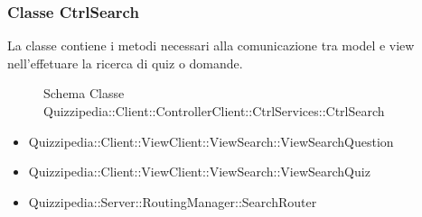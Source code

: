 \subsubsection{Classe CtrlSearch}
La classe contiene i metodi necessari alla comunicazione tra model e view nell'effetuare la ricerca di quiz o domande.
\begin{figure}[H]
\centering
\noindent{}
\caption{Schema Classe Quizzipedia::Client::ControllerClient::CtrlServices::CtrlSearch}
\end{figure}
\begin{itemize}
\item Quizzipedia::Client::ViewClient::ViewSearch::ViewSearchQuestion
\item Quizzipedia::Client::ViewClient::ViewSearch::ViewSearchQuiz
\end{itemize}
\begin{itemize}
\item Quizzipedia::Server::RoutingManager::SearchRouter
\end{itemize}
